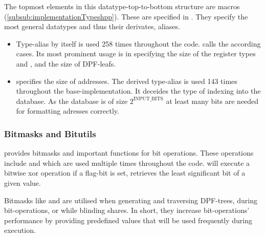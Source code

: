 The topmost elements in  this datatype-top-to-bottom structure are macros (\ref{subsub:implementationTypeshpp}).
These are specified in .
They specify the most general datatypes and thus their derivates, aliases.
\begin{itemize}
    \item Type-alias  by itself is used 258 times throughout the code.
     calls the according cases.
    Its most prominent usage is in specifying the size of the register types  and , and the size of DPF-leafs.
    \item {} specifies the size of addresses.
    The derived type-alias  is used 143 times throughout the base-implementation.
    It deceides the type of indexing into the database.
    As the database is of size $2^\text{INPUT\_BITS}$ at least  many bits are needed for formatting adresses correctly.
\end{itemize}

\subsubsection*{Bitmasks and Bitutils}\label{subsub:bitmasksAndBitutils}
 provides bitmasks and important functions for bit operations.
These operations include  and  which are used multiple times throughout the code.
 will execute a bitwise xor operation if a flag-bit is set,  retrieves the least significant bit of a given  value.

Bitmasks like  and  are utilised when generating and traversing DPF-trees, during bit-operations, or while blinding shares.
In short, they increase bit-operations' performance by providing predefined values that will be used frequently during execution.

